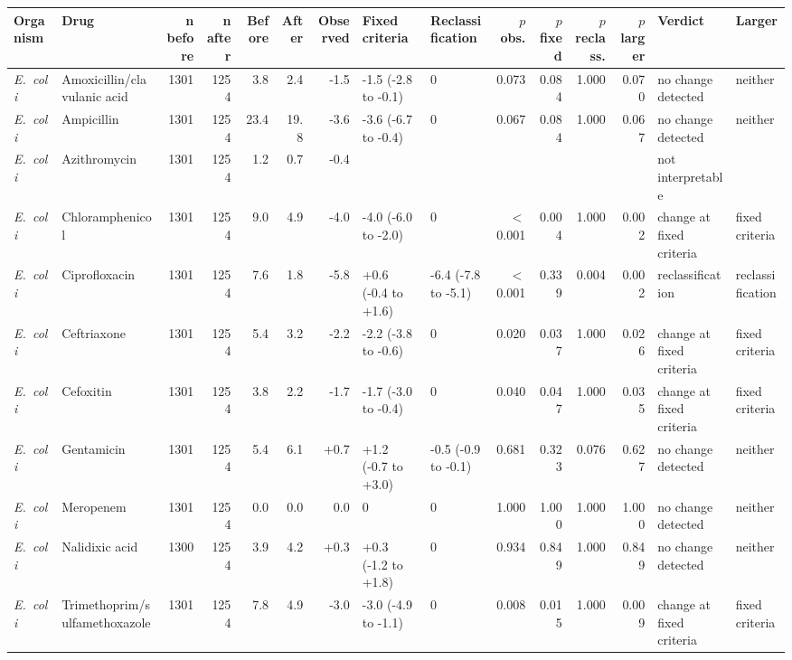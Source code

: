 \begin{table}[h]
\centering
\scriptsize
\begin{tabular}{llrrrrrllrrrrll}
\toprule
Organism & Drug & n before & n after & Before & After & Observed & Fixed criteria & Reclassification & $p$ obs. & $p$ fixed & $p$ reclass. & $p$ larger & Verdict & Larger \\
\midrule
\textit{E.~coli} & Amoxicillin/clavulanic acid & 1301 & 1254 & 3.8 & 2.4 & -1.5 & -1.5 (-2.8 to -0.1) & 0 & 0.073 & 0.084 & 1.000 & 0.070 & no change detected & neither \\
\textit{E.~coli} & Ampicillin & 1301 & 1254 & 23.4 & 19.8 & -3.6 & -3.6 (-6.7 to -0.4) & 0 & 0.067 & 0.084 & 1.000 & 0.067 & no change detected & neither \\
\textit{E.~coli} & Azithromycin & 1301 & 1254 & 1.2 & 0.7 & -0.4 &  &  &  &  &  &  & not interpretable &  \\
\textit{E.~coli} & Chloramphenicol & 1301 & 1254 & 9.0 & 4.9 & -4.0 & -4.0 (-6.0 to -2.0) & 0 & $<$0.001 & 0.004 & 1.000 & 0.002 & change at fixed criteria & fixed criteria \\
\textit{E.~coli} & Ciprofloxacin & 1301 & 1254 & 7.6 & 1.8 & -5.8 & +0.6 (-0.4 to +1.6) & -6.4 (-7.8 to -5.1) & $<$0.001 & 0.339 & 0.004 & 0.002 & reclassification & reclassification \\
\textit{E.~coli} & Ceftriaxone & 1301 & 1254 & 5.4 & 3.2 & -2.2 & -2.2 (-3.8 to -0.6) & 0 & 0.020 & 0.037 & 1.000 & 0.026 & change at fixed criteria & fixed criteria \\
\textit{E.~coli} & Cefoxitin & 1301 & 1254 & 3.8 & 2.2 & -1.7 & -1.7 (-3.0 to -0.4) & 0 & 0.040 & 0.047 & 1.000 & 0.035 & change at fixed criteria & fixed criteria \\
\textit{E.~coli} & Gentamicin & 1301 & 1254 & 5.4 & 6.1 & +0.7 & +1.2 (-0.7 to +3.0) & -0.5 (-0.9 to -0.1) & 0.681 & 0.323 & 0.076 & 0.627 & no change detected & neither \\
\textit{E.~coli} & Meropenem & 1301 & 1254 & 0.0 & 0.0 & 0.0 & 0 & 0 & 1.000 & 1.000 & 1.000 & 1.000 & no change detected & neither \\
\textit{E.~coli} & Nalidixic acid & 1300 & 1254 & 3.9 & 4.2 & +0.3 & +0.3 (-1.2 to +1.8) & 0 & 0.934 & 0.849 & 1.000 & 0.849 & no change detected & neither \\
\textit{E.~coli} & Trimethoprim/sulfamethoxazole & 1301 & 1254 & 7.8 & 4.9 & -3.0 & -3.0 (-4.9 to -1.1) & 0 & 0.008 & 0.015 & 1.000 & 0.009 & change at fixed criteria & fixed criteria \\

\end{tabular}
\end{table}

